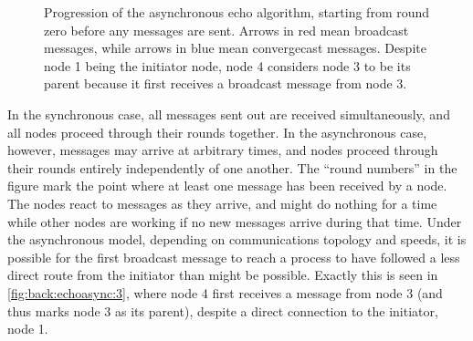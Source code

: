 \begin{figure}[htbp]
    \caption[Progression of the asynchronous echo algorithm]{Progression of the asynchronous echo algorithm, starting from round zero before any messages are sent.  Arrows in red mean broadcast messages, while arrows in blue mean convergecast messages.  Despite node 1 being the initiator node, node 4 considers node 3 to be its parent because it first receives a broadcast message from node 3.}
    \label{fig:back:echoasync}
\end{figure}

In the synchronous case, all messages sent out are received simultaneously, and all nodes proceed through their rounds together.  In the asynchronous case, however, messages may arrive at arbitrary times, and nodes proceed through their rounds entirely independently of one another.  The ``round numbers'' in the figure mark the point where at least one message has been received by a node.  The nodes react to messages as they arrive, and might do nothing for a time while other nodes are working if no new messages arrive during that time.  Under the asynchronous model, depending on communications topology and speeds, it is possible for the first broadcast message to reach a process to have followed a less direct route from the initiator than might be possible.  Exactly this is seen in \cref{fig:back:echoasync:3}, where node 4 first receives a message from node 3 (and thus marks node 3 as its parent), despite a direct connection to the initiator, node 1.